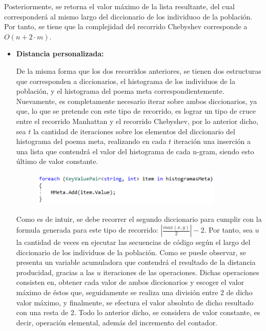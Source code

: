 \documentclass[journal]{IEEEtran}
\begin{document}
\begin{itemize}
	Posteriormente, se retorna el valor máximo de la lista resultante, del cual corresponderá al mismo largo del diccionario de los individuoo de la población.
	Por tanto, se tiene que la complejidad del recorrido Chebyshev corresponde a $ O(n + 2 \cdot m) $. \\
	
\end{itemize}

\begin{itemize}
	
	\item{\bf Distancia personalizada:}
	
	De la misma forma que los dos recorridos anteriores, se tienen dos estructuras que corresponden a diccionarios, el histograma de los individuos de la población, y el histograma del poema meta correspondientemente. Nuevamente, es completamente necesario iterar sobre ambos diccionarios, ya que, lo que se pretende con este tipo de recorrido, es lograr un tipo de cruce entre el recorrido Manhattan y el recorrido Chebyshev, por lo anterior dicho, sea $ t $ la cantidad de iteraciones sobre los elementos del diccionario del histograma del poema meta, realizando en cada $ t $ iteración una inserción a una lista que contendrá el valor del histograma de cada n-gram, siendo esto último de valor constante.
	
	\begin{figure}[h]
		\centering
		\includegraphics[width = 260pt]{Manhattan1.png}
		\caption{ }
	\end{figure}
	
	Como es de intuir, se debe recorrer el segundo diccionario para cumplir con la formula generada para este tipo de recorrido:
	{\large $ |\frac{max(x, y)}{2}| -2 $}. Por tanto, sea $ u $ la cantidad de veces en ejecutar las secuencias de código según el largo del diccionario de los individuos de la población.
	Como se puede observar, se presenta un variable acumuladora que contendrá el resultado de la distancia producidad, gracias a las $ u $ iteraciones de las operaciones. Dichas operaciones consisten en, obtener cada valor de ambos diccionarios y escoger el valor máximo de éstos que, seguidamente se realiza una división entre 2 de dicho valor máximo, y finalmente, se efectura el valor absoluto de dicho resultado con una resta de 2. Todo lo anterior dicho, se considera de valor constante, es decir, operación elemental, además del incremento del contador.
	

\end{itemize}
\end{document}
